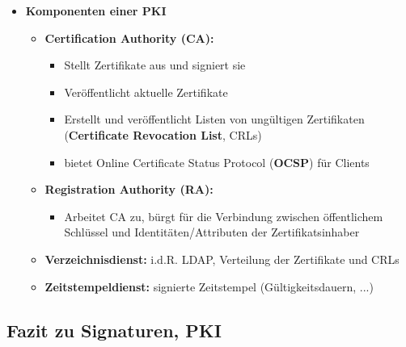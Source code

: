 \documentclass[openany]{book}
\begin{document}
\begin{itemize}
    \item \textbf{Komponenten einer PKI}
    \begin{itemize}
        \item \textbf{Certification Authority (CA):}
        \begin{itemize}
            \item Stellt Zertifikate aus und signiert sie
            \item Veröffentlicht aktuelle Zertifikate
            \item Erstellt und veröffentlicht Listen von ungültigen Zertifikaten (\textbf{Certificate Revocation List}, CRLs)
            \item bietet Online Certificate Status Protocol (\textbf{OCSP}) für Clients
        \end{itemize}
        \item \textbf{Registration Authority (RA):}
        \begin{itemize}
            \item Arbeitet CA zu, bürgt für die Verbindung zwischen öffentlichem Schlüssel und Identitäten/Attributen der Zertifikatsinhaber
        \end{itemize}
        \item \textbf{Verzeichnisdienst:} i.d.R. LDAP, Verteilung der Zertifikate und CRLs
        \item \textbf{Zeitstempeldienst:} signierte Zeitstempel (Gültigkeitsdauern, ...)
    \end{itemize}
\end{itemize}

\newpage

\subsection{Fazit zu Signaturen, PKI}
\end{document}
